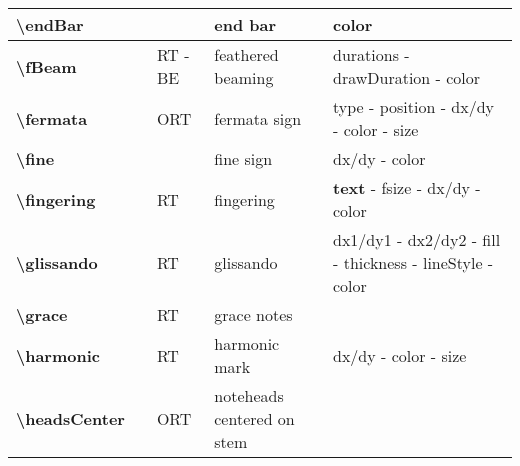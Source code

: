 \documentclass[a4paper, landscape, 10pt]{article}
\begin{document}
\begin{tabularx}{\linewidth}{p{3cm}p{4.5cm}p{3cm}p{5.5cm}l}
    \textbf{\textbackslash{}endBar}&&&end bar&color\\
    \hline
    \textbf{\textbackslash{}fBeam}&&RT - BE&feathered beaming&durations - drawDuration - color\\
    \hline
    \textbf{\textbackslash{}fermata}&&ORT&fermata sign&type - position - dx/dy - color - size\\
    \hline
    \textbf{\textbackslash{}fine}&&&fine sign&dx/dy - color\\
    \hline
    \textbf{\textbackslash{}fingering}&&RT&fingering&\textbf{text} - fsize - dx/dy - color\\
    \hline
    \textbf{\textbackslash{}glissando}&&RT&glissando&dx1/dy1 - dx2/dy2 - fill - thickness - lineStyle - color\\
    \hline
    \textbf{\textbackslash{}grace}&&RT&grace notes&\\
    \hline
    \textbf{\textbackslash{}harmonic}&&RT&harmonic mark&dx/dy - color - size\\
    \hline
    \textbf{\textbackslash{}headsCenter}&&ORT&noteheads centered on stem&\\
    \hline
\end{tabularx}
%
%
\end{document}

